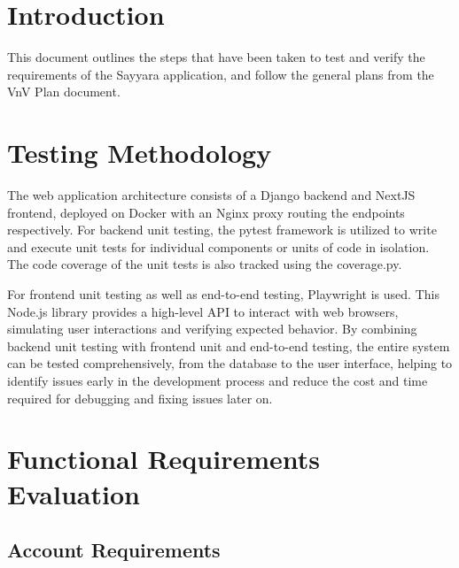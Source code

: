 \documentclass[12pt, titlepage]{article}
\begin{document}
\listoftables %

\listoffigures %

\newpage


\section{Introduction}

This document outlines the steps that have been taken to test and verify the requirements of the Sayyara application, and follow the general plans from the VnV Plan document. 

\section{Testing Methodology}

The web application architecture consists of a Django backend and NextJS frontend, deployed on Docker with an Nginx proxy routing the endpoints respectively. For backend unit testing, the pytest framework is utilized to write and execute unit tests for individual components or units of code in isolation. The code coverage of the unit tests is also tracked using the coverage.py.

For frontend unit testing as well as end-to-end testing, Playwright is used. This Node.js library provides a high-level API to interact with web browsers, simulating user interactions and verifying expected behavior. By combining backend unit testing with frontend unit and end-to-end testing, the entire system can be tested comprehensively, from the database to the user interface, helping to identify issues early in the development process and reduce the cost and time required for debugging and fixing issues later on.


\section{Functional Requirements Evaluation}
\subsection{Account Requirements}
\end{document}
